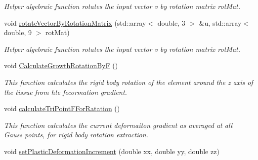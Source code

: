 \begin{DoxyCompactItemize}
\begin{DoxyCompactList}\small\item\em Helper algebraic function rotates the input vector v by rotation matrix rot\+Mat. \end{DoxyCompactList}\item 
\hypertarget{classShapeBase_adb9c0192df7d4de8232b52e7e3009ec5}{}void \hyperlink{classShapeBase_adb9c0192df7d4de8232b52e7e3009ec5}{rotate\+Vector\+By\+Rotation\+Matrix} (std\+::array$<$ double, 3 $>$ \&u, std\+::array$<$ double, 9 $>$ rot\+Mat)\label{classShapeBase_adb9c0192df7d4de8232b52e7e3009ec5}

\begin{DoxyCompactList}\small\item\em Helper algebraic function rotates the input vector v by rotation matrix rot\+Mat. \end{DoxyCompactList}\item 
void \hyperlink{classShapeBase_a9ae4c5fc8817528493502e3f75c9a984}{Calculate\+Growth\+Rotation\+By\+F} ()
\begin{DoxyCompactList}\small\item\em This function calculates the rigid body rotation of the element around the z axis of the tissue from hte fecormation gradient. \end{DoxyCompactList}\item 
\hypertarget{classShapeBase_a5f5e95f38f271d28f2856109b0256aa0}{}void \hyperlink{classShapeBase_a5f5e95f38f271d28f2856109b0256aa0}{calculate\+Tri\+Point\+F\+For\+Ratation} ()\label{classShapeBase_a5f5e95f38f271d28f2856109b0256aa0}

\begin{DoxyCompactList}\small\item\em This function calculates the current deformaiton gradient as averaged at all Gauss points, for rigid body rotation extraction. \end{DoxyCompactList}\item 
\hypertarget{classShapeBase_aa36cea09cbf418a9e37454016c5b3f30}{}void \hyperlink{classShapeBase_aa36cea09cbf418a9e37454016c5b3f30}{set\+Plastic\+Deformation\+Increment} (double xx, double yy, double zz)\label{classShapeBase_aa36cea09cbf418a9e37454016c5b3f30}


\end{DoxyCompactItemize}
